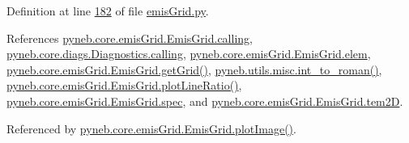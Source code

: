 Definition at line \hyperlink{emis_grid_8py_source_l00182}{182} of file \hyperlink{emis_grid_8py_source}{emis\-Grid.\-py}.



References \hyperlink{emis_grid_8py_source_l00044}{pyneb.\-core.\-emis\-Grid.\-Emis\-Grid.\-calling}, \hyperlink{diags_8py_source_l00169}{pyneb.\-core.\-diags.\-Diagnostics.\-calling}, \hyperlink{emis_grid_8py_source_l00048}{pyneb.\-core.\-emis\-Grid.\-Emis\-Grid.\-elem}, \hyperlink{emis_grid_8py_source_l00114}{pyneb.\-core.\-emis\-Grid.\-Emis\-Grid.\-get\-Grid()}, \hyperlink{misc_8py_source_l00055}{pyneb.\-utils.\-misc.\-int\-\_\-to\-\_\-roman()}, \hyperlink{emis_grid_8py_source_l00241}{pyneb.\-core.\-emis\-Grid.\-Emis\-Grid.\-plot\-Line\-Ratio()}, \hyperlink{emis_grid_8py_source_l00049}{pyneb.\-core.\-emis\-Grid.\-Emis\-Grid.\-spec}, and \hyperlink{emis_grid_8py_source_l00091}{pyneb.\-core.\-emis\-Grid.\-Emis\-Grid.\-tem2\-D}.



Referenced by \hyperlink{emis_grid_8py_source_l00140}{pyneb.\-core.\-emis\-Grid.\-Emis\-Grid.\-plot\-Image()}.


